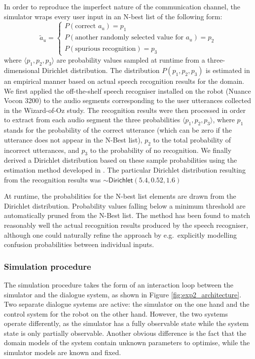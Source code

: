 In order to reproduce the imperfect nature of the communication channel, the simulator wraps every user input in an N-best list of the following form: 
\begin{equation}
\tilde{a}_u = \begin{cases} P(\text{correct } a_u) = p_1 \\ P(\text{another randomly selected value for } a_u) = p_2 \\ P(\text{spurious recognition}) = p_3 \end{cases} \nonumber
\end{equation}
where $\langle p_1, p_2, p_3 \rangle$ are probability values sampled at runtime from a three-dimensional Dirichlet distribution.  The distribution $P(p_1, p_2, p_3)$ is estimated in an empirical manner based on actual speech recognition results for the domain. We first applied the off-the-shelf speech recogniser installed on the robot (Nuance Vocon 3200) to the audio segments corresponding to the user utterances collected in the Wizard-of-Oz study.  The recognition results were then processed in order to extract from each audio segment the three probabilities $\langle p_1, p_2, p_3 \rangle$, where $p_1$ stands for the probability of the correct utterance (which can be zero if the utterance does not appear in the N-Best list), $p_2$ to the total probability of incorrect utterances, and $p_3$ to the probability of no recognition. We finally derived a Dirichlet distribution based on these sample probabilities using the estimation method developed in \cite{minka2003}.  The particular Dirichlet distribution resulting from the recognition results was $\sim\mathsf{Dirichlet}(5.4, 0.52, 1.6)$

At runtime, the probabilities for the N-best list elements are drawn from the Dirichlet distribution. Probability values falling below a minimum threshold are automatically pruned from the N-Best list. The method has been found to match reasonably well the actual recognition results produced by the speech recogniser, although one could naturally refine the approach by e.g.\ explicitly modelling confusion probabilities between individual inputs. 

\subsubsection*{Simulation procedure}
The simulation procedure takes the form of an interaction loop between the simulator and the dialogue system, as shown in Figure \ref{fig:exp2_architecture}.  Two separate dialogue systems are active: the simulator on the one hand and the control system for the robot on the other hand.  However, the two systems operate differently, as the simulator has a fully observable state while the system state is only partially observable.  Another obvious difference is the fact that the domain models of the system contain unknown parameters to optimise, while the simulator models are known and fixed.

